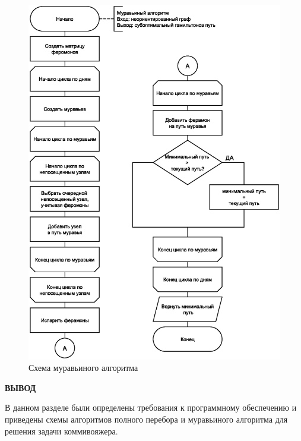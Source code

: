 \begin{figure}[H]
    \centering
    \includegraphics[scale=0.7]{img/unnamed2.eps}
    \caption{Схема муравьиного алгоритма}
    \label{fig:ant}
\end{figure}

\textbf{ВЫВОД}

В данном разделе были определены требования к программному обеспечению и приведены схемы алгоритмов полного перебора и муравьиного алгоритма для решения задачи коммивояжера.

\clearpage